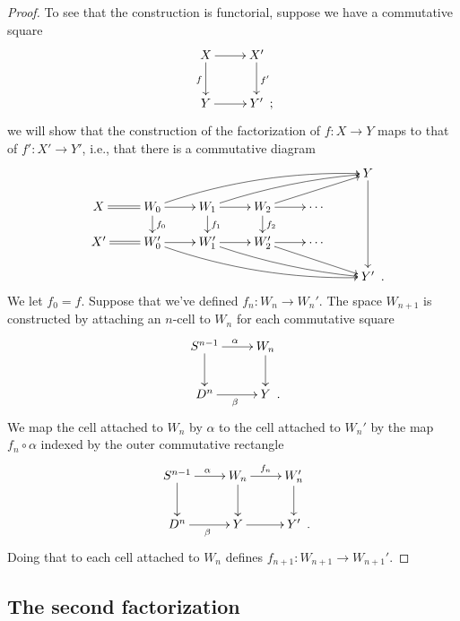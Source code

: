 \documentclass[12pt]{amsart}
\numberwithin{equation}{section}
\theoremstyle{slplain}
\theoremstyle{definition}
\theoremstyle{remark}
\newcommand{\Period}{\rlap{\enspace .}}
\newcommand{\Semicolon}{\rlap{\enspace ;}}
\begin{document}
\begin{proof}
  To see that the construction is functorial, suppose we have a
  commutative square
  \begin{displaymath}
    \xymatrix{
      {X} \ar[r] \ar[d]_{f}
      & {X'} \ar[d]^{f'}\\
      {Y} \ar[r]
      & {Y' \Semicolon}
    }
  \end{displaymath}
  we will show that the construction of the factorization of $f\colon
  X \to Y$ maps to that of $f'\colon X' \to Y'$, i.e., that there is a
  commutative diagram
  \begin{displaymath}
    \xymatrix@R=3ex{
      &&&&& {Y} \ar[ddd] \\
      {X} \ar@{=}[r]
      & {W_{0}} \ar[r] \ar[d]^{f_{0}} \ar@/^{2ex}/[rrrru]
      & {W_{1}} \ar[r] \ar[d]^{f_{1}} \ar@/^{1ex}/[rrru]
      & {W_{2}} \ar[r] \ar[d]^{f_{2}} \ar[rru]
      & {\cdots} \\
      {X'} \ar@{=}[r]
      & {W_{0}'} \ar[r] \ar@/_{2ex}/[rrrrd]
      & {W_{1}'} \ar[r] \ar@/_{1ex}/[rrrd]
      & {W_{2}'} \ar[r] \ar[rrd]
      & {\cdots} \\
      &&&&& {Y' \Period}
    }
  \end{displaymath}
  We let $f_{0} = f$.  Suppose that we've defined $f_{n}\colon W_{n}
  \to W_{n}'$.  The space $W_{n+1}$ is constructed by attaching an
  $n$-cell to $W_{n}$ for each commutative square
  \begin{displaymath}
    \xymatrix{
      {S^{n-1}} \ar[r]^{\alpha} \ar[d]
      & {W_{n}} \ar[d]\\
      {D^{n}} \ar[r]_{\beta}
      & {Y \Period}
    }
  \end{displaymath}
  We map the cell attached to $W_{n}$ by $\alpha$ to the cell attached
  to $W_{n}'$ by the map $f_{n}\circ \alpha$ indexed by the outer
  commutative rectangle
  \begin{displaymath}
    \xymatrix{
      {S^{n-1}} \ar[r]^{\alpha} \ar[d]
      & {W_{n}} \ar[d] \ar[r]^{f_{n}}
      & {W_{n}'} \ar[d]\\
      {D^{n}} \ar[r]_{\beta}
      & {Y} \ar[r]
      & {Y' \Period}
    }
  \end{displaymath}
  Doing that to each cell attached to $W_{n}$ defines $f_{n+1}\colon
  W_{n+1} \to W_{n+1}'$.
\end{proof}

\subsection{The second factorization}
\label{sec:FactSecond}
\end{document}
